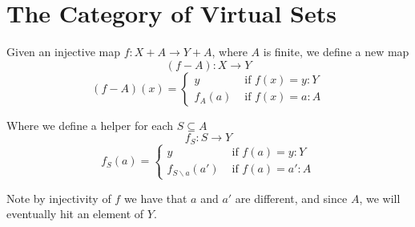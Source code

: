\documentclass{article}
\begin{document}






\section{The Category of Virtual Sets} 


\begin{definition}
    Given an injective map $f : X + A \to Y + A$, where $A$ is finite, we define a new map 
    \[ (f - A) : X \to Y \] 
    \[  (f-A)(x) = \begin{cases}
        y & \text{ if } f(x) = y : Y \\
        f_A(a) & \text{ if } f(x) = a : A 
    \end{cases} \]

    Where we define a helper for each $S \subseteq A$ 
    \[ f_S : S \to Y \]
    \[ f_S(a) = \begin{cases}
        y & \text{ if } f(a) = y : Y \\
        f_{S \backslash a}(a')&  \text{ if } f(a) = a' : A
    \end{cases}\]

    Note by injectivity of $f$ we have that $a$ and $a'$ are different, 
    and since $A$, we will eventually hit an element of $Y$.
\end{definition}
\end{document}
